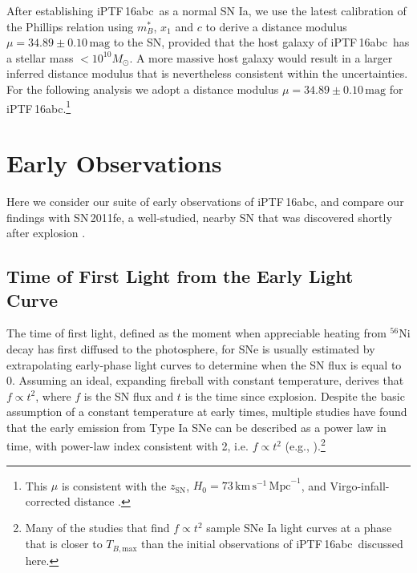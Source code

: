 \documentclass[twocolumn]{aastex61}
\newcommand{\sm}{M_\odot}
\newcommand{\abc}{iPTF\,16abc}
\begin{document}
After establishing \abc\ as a normal SN Ia, we use the latest
calibration \citep{2014A&A...568A..22B} of the Phillips relation
\citep{1993ApJ...413L.105P} using $m^*_{B}$, $x_1$ and $c$ to derive a distance modulus $\mu = 34.89 \pm 0.10 \,\textrm{mag}$ to the SN, provided that the host galaxy of \abc\ has a stellar mass $< 10^{10}\sm$. A more massive host galaxy would result in a larger inferred distance modulus that is nevertheless consistent within the uncertainties. For the following analysis we adopt a distance modulus $\mu = 34.89 \pm 0.10 \,\textrm{mag}$ for \abc.\footnote{This $\mu$ is consistent with the $z_\mathrm{SN}$, $H_0 = 73 \, \mathrm{km \, s^{-1} \, Mpc}^{-1}$, and Virgo-infall-corrected distance \citep{2000ApJ...529..786M}.}

\section{Early Observations}
\label{sec:first_light}

Here we consider our suite of early observations of \abc, and compare our findings with SN\,2011fe, a well-studied, nearby SN that was discovered shortly after explosion \citep{2011Natur.480..344N,2012ApJ...744L..17B,2014ApJ...784...85P}. 

\subsection{Time of First Light from the Early Light Curve}
\label{sec:lc_fit}

The time of first light, defined as the moment when appreciable heating from $^{56}$Ni decay has first diffused to the photosphere, for SNe is usually estimated by 
extrapolating early-phase light curves to determine when the 
SN flux is equal to 0. Assuming an ideal, expanding fireball with 
constant temperature, \citet{1982ApJ...253..785A} derives that $f 
\propto t^2$, where $f$ is the SN flux and $t$ is the time since 
explosion. Despite the basic assumption of a constant temperature at 
early times, multiple studies have found that the early emission 
from Type Ia SNe can be described as a power law in time, with 
power-law index consistent with 2, i.e. $f \propto t^2$ (e.g., \citealt{2006AJ....132.1707C, 2010ApJ...712..350H, 2011MNRAS.416.2607G}).\footnote{Many of the studies that find $f \propto t^2$ sample SNe Ia light curves at a phase that is closer to $T_{B,\mathrm{max}}$ than the initial observations of \abc\ discussed here.}
\end{document}
